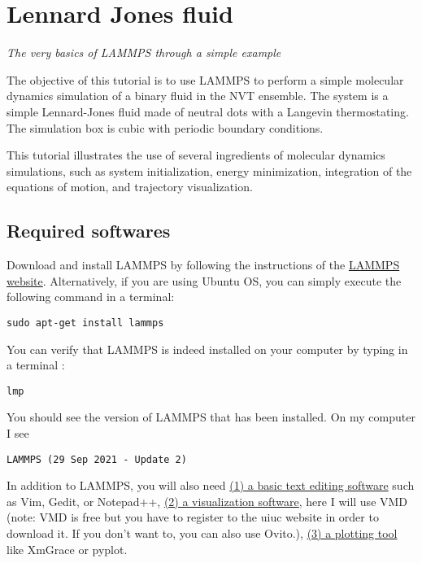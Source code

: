 \chapter{Lennard Jones fluid}
\label{lennard-jones-label}

\noindent \textit{The very basics of LAMMPS through a simple example}

The objective of this tutorial is to use
LAMMPS to perform a simple molecular dynamics simulation
of a binary fluid in the NVT ensemble. The system is a simple Lennard-Jones fluid
made of neutral dots with a Langevin thermostating. The
simulation box is cubic with periodic boundary conditions.

This tutorial illustrates the use of several ingredients of
molecular dynamics simulations, such as system initialization,
energy minimization, integration of the equations of motion,
and trajectory visualization.

\section{Required softwares}

Download and install LAMMPS by following the instructions of the \href{https://lammps.sandia.gov}{LAMMPS website}.
Alternatively, if you are using Ubuntu OS, you can simply execute the
following command in a terminal:

\begin{verbatim}
sudo apt-get install lammps
\end{verbatim}

\noindent You can verify that LAMMPS is indeed installed on your
computer by typing in a terminal :

\begin{verbatim}
lmp
\end{verbatim}

\noindent You should see the version of LAMMPS that has been
installed. On my computer I see

\begin{verbatim}
LAMMPS (29 Sep 2021 - Update 2)
\end{verbatim}

\noindent In addition to LAMMPS, you will also need \href{https://help.gnome.org/users/gedit/stable/}{(1) a basic text editing software}
such as Vim, Gedit, or Notepad++, \href{https://www.ks.uiuc.edu/Research/vmd/}{(2) a visualization software}, here I
will use VMD (note: VMD is free but you have to register to
the uiuc website in order to download it. If you don't want
to, you can also use Ovito.), \href{https://plasma-gate.weizmann.ac.il/Grace/}{(3) a plotting tool} like
XmGrace or pyplot.

